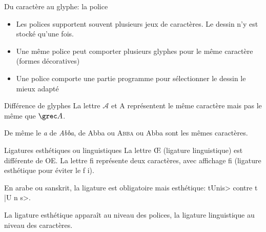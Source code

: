 \begin{frame}{Du caractère au glyphe: la police}
  \begin{itemize}
  \item Les polices supportent souvent plusieurs jeux de caractères. Le
    dessin n'y est stocké qu'une fois.
  \item[\dialogerror] Une même police peut comporter plusieurs glyphes pour le même caractère (formes décoratives)
  \item Une police comporte une partie programme pour sélectionner le dessin le mieux adapté
  \end{itemize}
  \begin{block}{Différence de glyphes}
    La lettre {\Large{$\mathcal{A}$}} et {\Large{A}} représentent le
    même caractère mais pas le même que $\Alpha$.

    De même le \emph{a} de \emph{Abba}, de {\selectfont
      Abba} ou \textsc{Abba} ou \textrm{Abba} sont les mêmes caractères.
  \end{block}

  \begin{block}{Ligatures esthétiques ou linguistiques}
    La lettre {\Large\OE{}} (ligature linguistique) est différente de
    {\Large{OE}}. La lettre {\textrm{\Large f{}i}} représente deux caractères,
    avec affichage \textrm{\Large{fi}} (ligature esthétique pour éviter le
    \textrm{\Large{f\kern -1pt i}}).

    En arabe ou sanskrit, la ligature est obligatoire mais esthétique:
    \novocalize
    \<tUnis> contre \<t |U n s>.

    La ligature esthétique apparaît au niveau des polices, la ligature
    linguistique au niveau des caractères.
  \end{block}
\end{frame}
